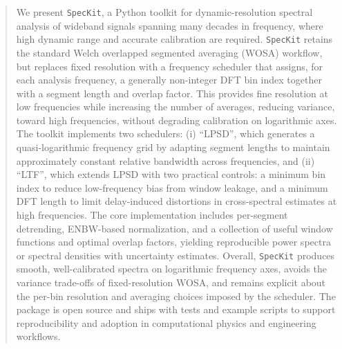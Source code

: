 \documentclass[final, 5p, times, twocolumn, number, sort&compress]{elsarticle}
\begin{document}
\begin{abstract}

We present \texttt{SpecKit}, a Python toolkit for dynamic-resolution spectral analysis of wideband signals spanning many decades in frequency, where high dynamic range and accurate calibration are required. \texttt{SpecKit} retains the standard Welch overlapped segmented averaging (WOSA) workflow, but replaces fixed resolution with a frequency scheduler that assigns, for each analysis frequency, a generally non-integer DFT bin index together with a segment length and overlap factor. This provides fine resolution at low frequencies while increasing the number of averages, reducing variance, toward high frequencies, without degrading calibration on logarithmic axes. The toolkit implements two schedulers: (i) ``LPSD'', which generates a quasi-logarithmic frequency grid by adapting segment lengths to maintain approximately constant relative bandwidth across frequencies, and (ii) ``LTF'', which extends LPSD with two practical controls: a minimum bin index to reduce low-frequency bias from window leakage, and a minimum DFT length to limit delay-induced distortions in cross-spectral estimates at high frequencies. The core implementation includes per-segment detrending, ENBW-based normalization, and a collection of useful window functions and optimal overlap factors, yielding reproducible power spectra or spectral densities with uncertainty estimates. Overall, \texttt{SpecKit} produces smooth, well-calibrated spectra on logarithmic frequency axes, avoids the variance trade-offs of fixed-resolution WOSA, and remains explicit about the per-bin resolution and averaging choices imposed by the scheduler. The package is open source and ships with tests and example scripts to support reproducibility and adoption in computational physics and engineering workflows.
\bigskip


\end{abstract}
\end{document}
